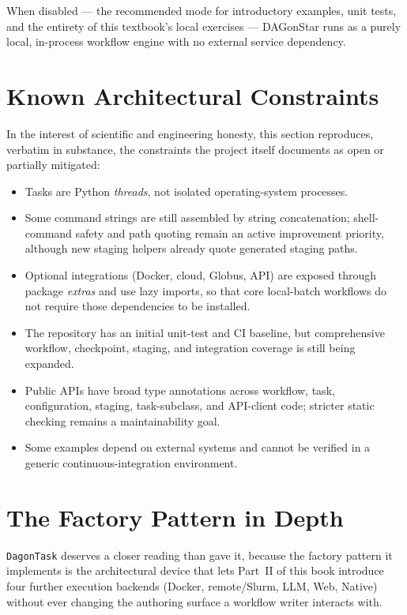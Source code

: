 When disabled --- the recommended mode for introductory examples, unit tests,
and the entirety of this textbook's local exercises --- DAGonStar runs as a
purely local, in-process workflow engine with no external service
dependency.

\section{Known Architectural Constraints}
\label{sec:known-constraints}

In the interest of scientific and engineering honesty, this section
reproduces, verbatim in substance, the constraints the project itself
documents as open or partially mitigated:

\begin{cautionbox}
\begin{itemize}[leftmargin=1.4em]
  \item Tasks are Python \emph{threads}, not isolated operating-system
    processes.
  \item Some command strings are still assembled by string concatenation;
    shell-command safety and path quoting remain an active improvement
    priority, although new staging helpers already quote generated staging
    paths.
  \item Optional integrations (Docker, cloud, Globus, API) are exposed
    through package \emph{extras} and use lazy imports, so that core
    local-batch workflows do not require those dependencies to be installed.
  \item The repository has an initial unit-test and CI baseline, but
    comprehensive workflow, checkpoint, staging, and integration coverage is
    still being expanded.
  \item Public APIs have broad type annotations across workflow, task,
    configuration, staging, task-subclass, and API-client code; stricter
    static checking remains a maintainability goal.
  \item Some examples depend on external systems and cannot be verified in a
    generic continuous-integration environment.
\end{itemize}
\end{cautionbox}

\section{The Factory Pattern in Depth}
\label{sec:factory-pattern-depth}

\texttt{DagonTask} deserves a closer reading than 
gave it, because the factory pattern it implements is the architectural
device that lets Part~II of this book introduce four further execution
backends (Docker, remote/Slurm, LLM, Web, Native) without ever changing the
authoring surface a workflow writer interacts with.

